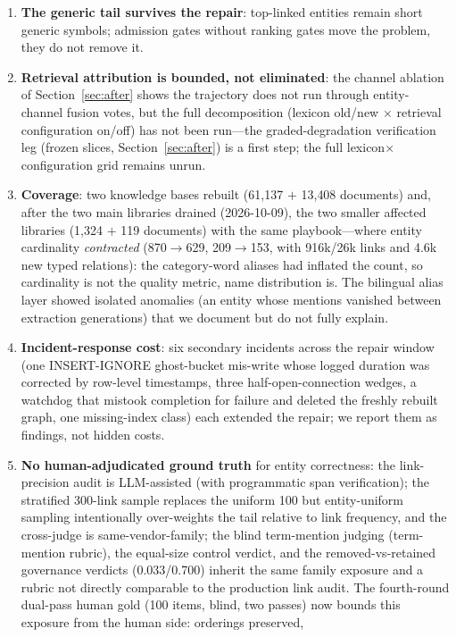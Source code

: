 \documentclass[preprint,12pt]{elsarticle}
\begin{document}
\begin{enumerate}
\item \textbf{The generic tail survives the repair}: top-linked entities
remain short generic symbols; admission gates without ranking gates move
the problem, they do not remove it.
\item \textbf{Retrieval attribution is bounded, not eliminated}: the
channel ablation of Section~\ref{sec:after} shows the trajectory does not
run through entity-channel fusion votes, but the full decomposition
(lexicon old/new $\times$ retrieval configuration on/off) has not been
run---the graded-degradation verification leg (frozen
slices, Section~\ref{sec:after}) is a first step; the full
lexicon$\times$configuration grid remains unrun.
\item \textbf{Coverage}: two knowledge bases rebuilt (61{,}137 $+$
13{,}408 documents) and, after the two main libraries drained (2026-10-09), the two smaller
affected libraries (1{,}324 $+$ 119 documents) with the same playbook---where
entity cardinality \emph{contracted} (870$\to$629, 209$\to$153, with
916k/26k links and 4.6k new typed relations): the category-word aliases had
inflated the count, so cardinality is not the quality metric, name
distribution is. The bilingual alias layer showed isolated anomalies (an
entity whose mentions vanished between extraction generations) that we
document but do not fully explain.
\item \textbf{Incident-response cost}: six secondary incidents across the
repair window (one INSERT-IGNORE ghost-bucket mis-write whose logged duration was
corrected by row-level timestamps, three half-open-connection wedges, a watchdog that mistook completion for
failure and deleted the freshly rebuilt graph, one missing-index class)
each extended the repair; we report them as findings, not hidden costs.
\item \textbf{No human-adjudicated ground truth} for entity correctness:
the link-precision audit is LLM-assisted (with programmatic span
verification); the stratified 300-link sample replaces the uniform 100
but entity-uniform sampling intentionally over-weights the tail
relative to link frequency, and the cross-judge is same-vendor-family;
the blind term-mention judging (term-mention rubric), the equal-size
control verdict, and the removed-vs-retained governance verdicts
(0.033/0.700) inherit the same family exposure and a rubric not
directly comparable to the production link audit.
The fourth-round dual-pass human gold (100 items, blind, two passes)
now bounds this exposure from the human side: orderings preserved,

\end{enumerate}
\end{document}
